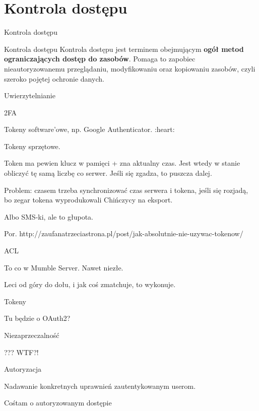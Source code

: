 \section{Kontrola dostępu}

\begin{frame}{Kontrola dostępu}
		\begin{alertblock}{Kontrola dostępu}
			Kontrola dostępu jest terminem obejmującym \textbf{ogół metod ograniczających dostęp do zasobów}.
			Pomaga to zapobiec nieautoryzowanemu przeglądaniu, modyfikowaniu oraz kopiowaniu zasobów, czyli szeroko pojętej ochronie danych. 
		\end{alertblock}		
\end{frame}


\begin{frame}{Uwierzytelnianie}

\end{frame}

\begin{frame}{2FA}
	
	Tokeny software'owe, np. Google Authenticator. :heart: %
	
	Tokeny sprzętowe.
	
	Token ma pewien klucz w pamięci + zna aktualny czas. Jest wtedy w stanie obliczyć tę samą liczbę co serwer. Jeśli się zgadza, to puszcza dalej.
	
	Problem: czasem trzeba synchronizować czas serwera i tokena, jeśli się rozjadą, bo zegar tokena wyprodukowali Chińczycy na eksport.
	
	Albo SMS-ki, ale to głupota.
	
	Por. http://zaufanatrzeciastrona.pl/post/jak-absolutnie-nie-uzywac-tokenow/
	
\end{frame}

\begin{frame}{ACL}
	
	To co w Mumble Server. Nawet niezłe.
	
	Leci od góry do dołu, i jak coś zmatchuje, to wykonuje.
	
\end{frame}

\begin{frame}{Tokeny}
	
	Tu będzie o OAuth2?
	
\end{frame}

\begin{frame}{Niezaprzeczalność}
	
	??? WTF?!
	
\end{frame}

\begin{frame}{Autoryzacja}
	
	Nadawanie konkretnych uprawnień zautentykowanym userom.
	
\end{frame}

\begin{frame}{Cośtam o autoryzowanym dostępie}
	
\end{frame}


